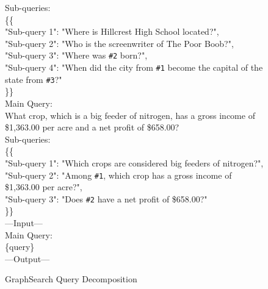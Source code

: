 \begin{figure}[t]
\begin{tcolorbox}[mybluebox, width=\textwidth, title={Query Decomposition}]
Sub-queries:\\
\{\{\\
"Sub-query 1": "Where is Hillcrest High School located?",\\
"Sub-query 2": "Who is the screenwriter of The Poor Boob?",\\
"Sub-query 3": "Where was \texttt{\#2} born?",\\
"Sub-query 4": "When did the city from \texttt{\#1} become the capital of the state from \texttt{\#3}?"\\
\}\}\\[4pt]
Main Query:\\
What crop, which is a big feeder of nitrogen, has a gross income of \$1,363.00 per acre and a net profit
of \$658.00?\\
Sub-queries:\\
\{\{\\
"Sub-query 1": "Which crops are considered big feeders of nitrogen?",\\
"Sub-query 2": "Among \texttt{\#1}, which crop has a gross income of \$1,363.00 per acre?",\\
"Sub-query 3": "Does \texttt{\#2} have a net profit of \$658.00?"\\
\}\}\\[4pt]
---Input---\\
Main Query:\\
\{query\}\\[2pt]
---Output---

\end{tcolorbox}
\caption{GraphSearch Query Decomposition}
\end{figure}

